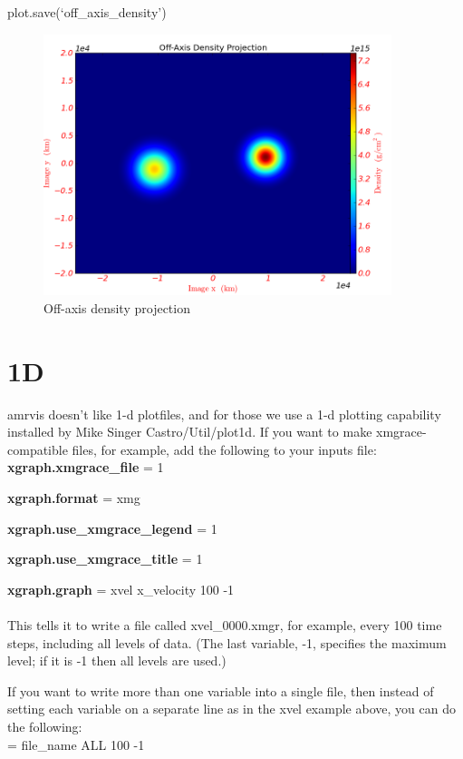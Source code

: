 plot.save(`off\_axis\_density')
\begin{figure}[h]
  \centering
  \includegraphics[width=4in]{OffAxisProjection_density}
  \caption{Off-axis density projection}
\end{figure}


\section{1D}

amrvis doesn't like 1-d plotfiles, and for those we use a 1-d plotting
capability installed by Mike Singer Castro/Util/plot1d.  If you want
to make xmgrace-compatible files, for example, add the following to
your inputs file:\\

{\bf xgraph.xmgrace\_file} = 1

{\bf xgraph.format} = xmg

{\bf xgraph.use\_xmgrace\_legend} = 1

{\bf xgraph.use\_xmgrace\_title} = 1

{\bf xgraph.graph} = xvel x\_velocity 100 -1\\ \\
This tells it to write a file called xvel\_0000.xmgr, for example, every 100 time steps, including all levels of data. (The last variable, -1, specifies the maximum level; if it is -1 then all levels are used.)

If you want to write more than one variable into a single file, then instead of
setting each variable on a separate line as in the xvel example above,
you can do the following: \\

 = file\_name ALL 100 -1\\


